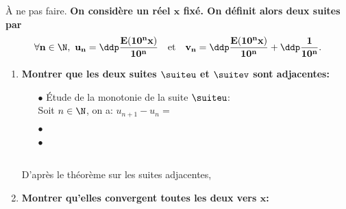 \begin{correction}
\`{A} ne pas faire.
\textbf{On consid\`{e}re un r\'eel $\mathbf{x}$ fix\'e. On d\'efinit alors deux suites par}
$$\mathbf{\forall n\in\N,\ u_n=\ddp\frac{E(10^n x)}{10^n}\quad \hbox{et}\quad v_n=\ddp\frac{E(10^n x)}{10^n}+\ddp\frac{1}{10^n}.}$$
\begin{enumerate}
\item \textbf{Montrer que les deux suites $\mathbf{\suiteu}$ et $\mathbf{\suitev}$ sont adjacentes:}
\begin{itemize}
\item[$\bullet$] \'Etude de la monotonie de la suite $\suiteu$:\\
\noindent Soit $n\in\N$, on a: $u_{n+1}-u_n=$

\item[$\bullet$]
\item[$\bullet$]
\end{itemize}
\\
\noindent D'apr\`{e}s le th\'eor\`{e}me sur les suites adjacentes, 
\item \textbf{Montrer qu'elles convergent toutes les deux vers $\mathbf{x}$:}\\
\noindent 
\end{enumerate}
\end{correction}